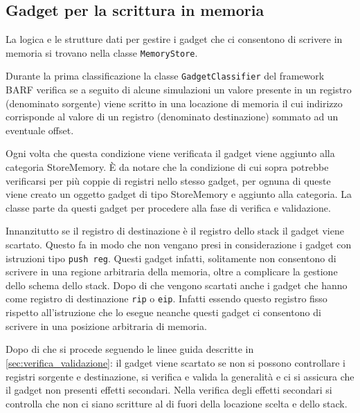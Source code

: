 \subsection{Gadget per la scrittura in memoria}
\label{sec:memorystore}

La logica e le strutture dati per gestire i gadget che ci consentono
di scrivere in memoria si trovano nella classe
\lstinline{MemoryStore}. 

Durante la prima classificazione la classe
\lstinline{GadgetClassifier} del framework BARF verifica se a seguito
di alcune simulazioni un valore presente in un registro (denominato
sorgente) viene scritto in una locazione di memoria il cui indirizzo
corrisponde al valore di un registro (denominato destinazione) sommato
ad un eventuale offset.

Ogni volta che questa condizione viene verificata il gadget viene
aggiunto alla categoria StoreMemory. È da notare che la condizione di
cui sopra potrebbe verificarsi per più coppie di registri nello stesso
gadget, per ognuna di queste viene creato un oggetto gadget di tipo
StoreMemory e aggiunto alla categoria. La classe parte da questi
gadget per procedere alla fase di verifica e validazione.

Innanzitutto se il registro di destinazione è il registro dello stack
il gadget viene scartato. Questo fa in modo che non vengano presi in
considerazione i gadget con istruzioni tipo \lstinline{push reg}.
Questi gadget infatti, solitamente non consentono di scrivere in una
regione arbitraria della memoria, oltre a complicare la gestione dello
schema dello stack. Dopo di che vengono scartati anche i gadget che
hanno come registro di destinazione \lstinline{rip} o
\lstinline{eip}. Infatti essendo questo registro fisso rispetto
all'istruzione che lo esegue neanche questi gadget ci consentono di
scrivere in una posizione arbitraria di memoria.

Dopo di che si procede seguendo le linee guida descritte in
\ref{sec:verifica_validazione}: il gadget viene scartato se non si
possono controllare i registri sorgente e destinazione, si verifica e
valida la generalità e ci si assicura che il gadget non presenti
effetti secondari. Nella verifica degli effetti secondari si controlla
che non ci siano scritture al di fuori della locazione scelta e dello
stack.

